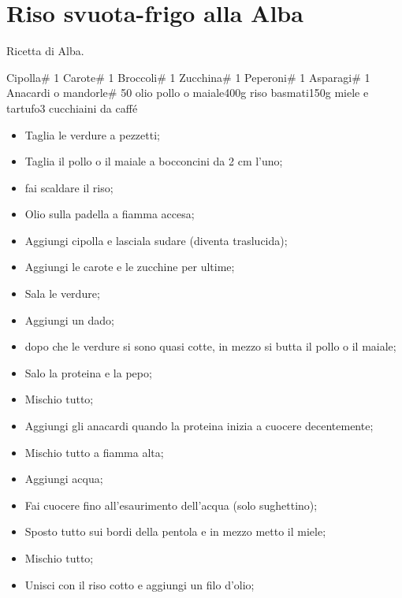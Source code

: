 \section{Riso svuota-frigo alla Alba}

Ricetta di Alba.
\generalRecipeInfos{}

\ingredienti%
    {Cipolla}{\# 1}%
    {Carote}{\# 1}%
    {Broccoli}{\# 1}%
    {Zucchina}{\# 1}%
    {Peperoni}{\# 1}%
    {Asparagi}{\# 1}%
    {Anacardi o mandorle}{\# 50}%
    {olio}{\qb{}}%
    {pollo o maiale}{400g}%
    {riso basmati}{150g}%
    {miele e tartufo}{3 cucchiaini da caffé}%

\begin{itemize}
    \item Taglia le verdure a pezzetti;
    \item Taglia il pollo o il maiale a bocconcini da 2 cm l'uno;
    \item fai scaldare il riso;
    \item Olio sulla padella a fiamma accesa;
    \item Aggiungi cipolla e lasciala sudare (diventa traslucida);
    \item Aggiungi le carote e le zucchine per ultime;
    \item Sala le verdure;
    \item Aggiungi un dado;
    \item dopo che le verdure si sono quasi cotte, in mezzo si butta il pollo o il maiale;
    \item Salo la proteina e la pepo;
    \item Mischio tutto;
    \item Aggiungi gli anacardi quando la proteina inizia a cuocere decentemente;
    \item Mischio tutto a fiamma alta;
    \item Aggiungi acqua;
    \item Fai cuocere fino all'esaurimento dell'acqua (solo sughettino);
    \item Sposto tutto sui bordi della pentola e in mezzo metto il miele;
    \item Mischio tutto;
    \item Unisci con il riso cotto e aggiungi un filo d'olio;
\end{itemize}